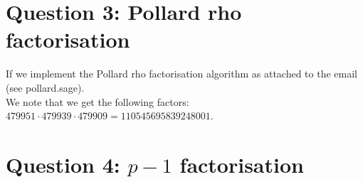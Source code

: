 \documentclass{article}
\begin{document}
\section{Question 3: Pollard rho factorisation}

If we implement the Pollard rho factorisation algorithm as attached to the email (see pollard.sage). \\
\noindent
We note that we get the following factors: $479951 \cdot 479939 \cdot 479909 = 110545695839248001$.



\section{Question 4: $p - 1$ factorisation}
\end{document}
